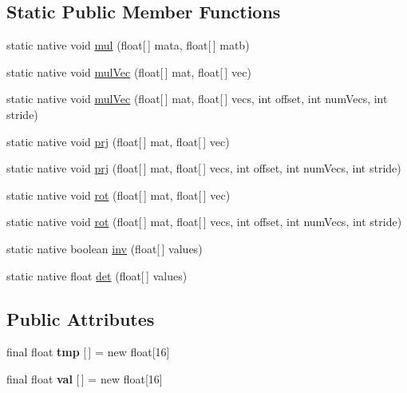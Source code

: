 \subsection*{Static Public Member Functions}
\begin{DoxyCompactItemize}
\item 
static native void \hyperlink{classairhockeyjava_1_1util_1_1_matrix4_ac66884f6965e9e3be74d60f65b867a3a}{mul} (float\mbox{[}$\,$\mbox{]} mata, float\mbox{[}$\,$\mbox{]} matb)
\item 
static native void \hyperlink{classairhockeyjava_1_1util_1_1_matrix4_a00c3378f50c3dbebd17d49d62a23f28c}{mul\+Vec} (float\mbox{[}$\,$\mbox{]} mat, float\mbox{[}$\,$\mbox{]} vec)
\item 
static native void \hyperlink{classairhockeyjava_1_1util_1_1_matrix4_aa36efdc7031e09f054fd807832274588}{mul\+Vec} (float\mbox{[}$\,$\mbox{]} mat, float\mbox{[}$\,$\mbox{]} vecs, int offset, int num\+Vecs, int stride)
\item 
static native void \hyperlink{classairhockeyjava_1_1util_1_1_matrix4_a8eaf2d70164b76b8fb36ad40efae697f}{prj} (float\mbox{[}$\,$\mbox{]} mat, float\mbox{[}$\,$\mbox{]} vec)
\item 
static native void \hyperlink{classairhockeyjava_1_1util_1_1_matrix4_ae1d2a896e288ba6ca11a3dde89eb157d}{prj} (float\mbox{[}$\,$\mbox{]} mat, float\mbox{[}$\,$\mbox{]} vecs, int offset, int num\+Vecs, int stride)
\item 
static native void \hyperlink{classairhockeyjava_1_1util_1_1_matrix4_a87e22249a5357f8e9fbf09c17b8265d4}{rot} (float\mbox{[}$\,$\mbox{]} mat, float\mbox{[}$\,$\mbox{]} vec)
\item 
static native void \hyperlink{classairhockeyjava_1_1util_1_1_matrix4_a9f3e7de9e61f47eba47d681515aa01a9}{rot} (float\mbox{[}$\,$\mbox{]} mat, float\mbox{[}$\,$\mbox{]} vecs, int offset, int num\+Vecs, int stride)
\item 
static native boolean \hyperlink{classairhockeyjava_1_1util_1_1_matrix4_a2579d2ed83bde58556644dfb5bf70aed}{inv} (float\mbox{[}$\,$\mbox{]} values)
\item 
static native float \hyperlink{classairhockeyjava_1_1util_1_1_matrix4_adc94a59b43e79005d5d4d4b6339f3426}{det} (float\mbox{[}$\,$\mbox{]} values)
\end{DoxyCompactItemize}
\subsection*{Public Attributes}
\begin{DoxyCompactItemize}
\item 
\hypertarget{classairhockeyjava_1_1util_1_1_matrix4_ad9da15d6fc6817ad21bf448394f3ce02}{}final float {\bfseries tmp} \mbox{[}$\,$\mbox{]} = new float\mbox{[}16\mbox{]}\label{classairhockeyjava_1_1util_1_1_matrix4_ad9da15d6fc6817ad21bf448394f3ce02}

\item 
\hypertarget{classairhockeyjava_1_1util_1_1_matrix4_ad7aef131a876f6b9271d10eee466fbdc}{}final float {\bfseries val} \mbox{[}$\,$\mbox{]} = new float\mbox{[}16\mbox{]}\label{classairhockeyjava_1_1util_1_1_matrix4_ad7aef131a876f6b9271d10eee466fbdc}

\end{DoxyCompactItemize}
